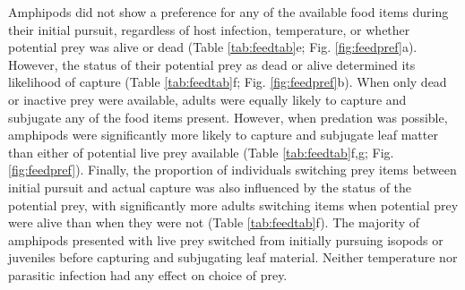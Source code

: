 Amphipods did not show a preference for any of the available food items during their initial pursuit, regardless of host infection, temperature, or whether potential prey was alive or dead (Table \ref{tab:feedtab}e; Fig. \ref{fig:feedpref}a). However, the status of their potential prey as dead or alive determined its likelihood of capture (Table \ref{tab:feedtab}f; Fig. \ref{fig:feedpref}b). When only dead or inactive prey were available, adults were equally likely to capture and subjugate any of the food items present. However, when predation was possible, amphipods were significantly more likely to capture and subjugate leaf matter than either of potential live prey available (Table \ref{tab:feedtab}f,g; Fig. \ref{fig:feedpref}). Finally, the proportion of individuals switching prey items between initial pursuit and actual capture was also influenced by the status of the potential prey, with significantly more adults switching items when potential prey were alive than when they were not (Table \ref{tab:feedtab}f). The majority of amphipods presented with live prey switched from initially pursuing isopods or juveniles before capturing and subjugating leaf material. Neither temperature nor parasitic infection had any effect on choice of prey. 

